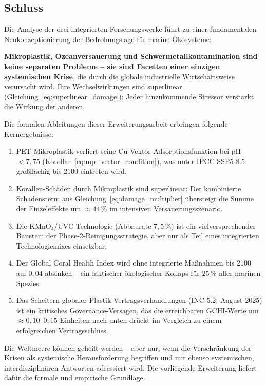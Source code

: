 ﻿\documentclass[12pt,a4paper]{article}
\theoremstyle{definition}
\theoremstyle{remark}
\newcommand{\MP}{Mikroplastik}
\begin{document}
\subsection{Schluss}
\label{subsec:schluss}

Die Analyse der drei integrierten Forschungswerke führt zu einer fundamentalen
Neukonzeptionierung der Bedrohungslage für marine Ökosysteme:

\textbf{Mikroplastik, Ozeanversauerung und Schwermetallkontamination sind keine
separaten Probleme -- sie sind Facetten einer einzigen systemischen Krise}, die durch
die globale industrielle Wirtschaftsweise verursacht wird. Ihre Wechselwirkungen
sind superlinear (Gleichung~\eqref{eq:superlinear_damage}): Jeder hinzukommende
Stressor verstärkt die Wirkung der anderen.

Die formalen Ableitungen dieser Erweiterungsarbeit erbringen folgende
Kernergebnisse:
\begin{enumerate}[leftmargin=*, label=\textbf{K\arabic*.}]
  \item PET-Mikroplastik verliert seine Cu-Vektor-Adsorptionsfunktion bei
    pH~$< 7{,}75$ (Korollar~\ref{eq:mp_vector_condition}), was unter
    IPCC-SSP5-8.5 großfl\"achig bis 2100 eintreten wird.
  \item Korallen-Schäden durch \MP{} sind superlinear: Der kombinierte
    Schadensterm aus Gleichung~\eqref{eq:damage_multiplier} übersteigt die
    Summe der Einzeleffekte um ${\approx}44\,\%$ im intensiven
    Versauerungsszenario.
  \item Die KMnO$_4$/UVC-Technologie (Abbaurate $7{,}5\,\%$) ist ein
    vielversprechender Baustein der Phase-2-Reinigungsstrategie,
    aber nur als Teil eines integrierten Technologiemixes einsetzbar.
  \item Der Global Coral Health Index wird ohne integrierte Maßnahmen
    bis 2100 auf $0{,}04$ absinken -- ein faktischer ökologischer Kollaps
    für $25\,\%$ aller marinen Spezies.
  \item Das Scheitern globaler Plastik-Vertragsverhandlungen (INC-5.2, August 2025)
    ist ein kritisches Governance-Versagen, das die erreichbaren GCHI-Werte
    um $\approx 0{,}10$--$0{,}15$ Einheiten nach unten drückt im Vergleich
    zu einem erfolgreichen Vertragsschluss.
\end{enumerate}

Die Weltmeere k\"onnen geheilt werden -- aber nur, wenn die Verschränkung der
Krisen als systemische Herausforderung begriffen und mit ebenso systemischen,
interdisziplin\"aren Antworten adressiert wird.
Die vorliegende Erweiterung liefert daf\"ur die formale und empirische Grundlage.
\end{document}
